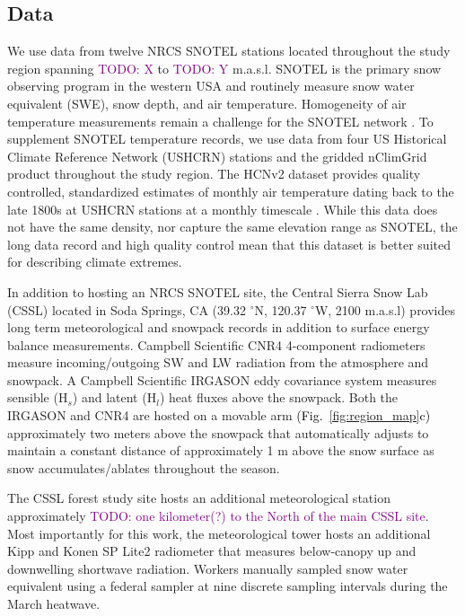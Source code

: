 \documentclass[12pt]{iopjournal}
\newcommand{\fig}[2]{\textcolor{black}{(Fig.~\ref{#1}{#2})}}   %
\newcommand{\comment}[1]{\textcolor{purple}{TODO: #1}}      %
\begin{document}
\subsection{Data}
We use data from twelve NRCS SNOTEL stations located throughout the study region spanning \comment{X} to \comment{Y} m.a.s.l.
SNOTEL is the primary snow observing program in the western USA \citep{Serreze1999-as} and routinely measure snow water equivalent (SWE), snow depth, and air temperature. 
Homogeneity of air temperature measurements remain a challenge for the SNOTEL network \citep{Oyler2015-by, McAfee2019-mt}.
To supplement SNOTEL temperature records, we use data from four US Historical Climate Reference Network (USHCRN) stations and the gridded nClimGrid product throughout the study region. 
The HCNv2 dataset provides quality controlled, standardized estimates of monthly air temperature dating back to the late 1800s at USHCRN stations  at a monthly timescale \cite{Menne2009-ushcn}.
While this data does not have the same density, nor capture the same elevation range as SNOTEL, the long data record and high quality control mean that this dataset is better suited for describing climate extremes.

In addition to hosting an NRCS SNOTEL site, the Central Sierra Snow Lab (CSSL) located in Soda Springs, CA (39.32 $^\circ$N, 120.37 $^\circ$W, 2100 m.a.s.l) provides long term meteorological and snowpack records in addition to surface energy balance measurements. 
Campbell Scientific CNR4 4-component radiometers measure incoming/outgoing SW and LW radiation from the atmosphere and snowpack.
A Campbell Scientific IRGASON eddy covariance system measures sensible (H$_s$) and latent (H$_l$)  heat fluxes above the snowpack.
Both the IRGASON and CNR4 are hosted on a movable arm \fig{fig:region_map}{c} approximately two meters above the snowpack that automatically adjusts to maintain a constant distance of approximately 1 m above the snow surface as snow accumulates/ablates throughout the season. 

The CSSL forest study site hosts an additional meteorological station approximately \comment{one kilometer(?) to the North of the main CSSL site}.
Most importantly for this work, the meteorological tower hosts an additional Kipp and Konen SP Lite2 radiometer that measures below-canopy up and downwelling shortwave radiation.
Workers manually sampled snow water equivalent using a federal sampler at nine discrete sampling intervals during the March heatwave.
\end{document}
